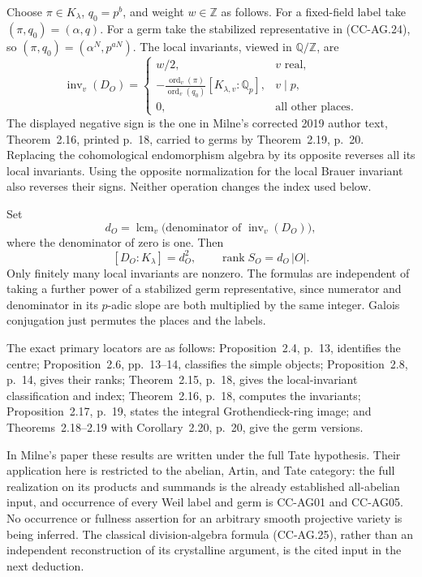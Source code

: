 Choose \(\pi\in K_\lambda\), \(q_0=p^b\), and weight
\(w\in\mathbb Z\) as follows.  For a fixed-field label take
\((\pi,q_0)=(\alpha,q)\).  For a germ take the stabilized
representative in (CC-AG.24), so
\((\pi,q_0)=(\alpha^N,p^{aN})\).
The local invariants, viewed in \(\mathbb Q/\mathbb Z\), are
\[
 \operatorname{inv}_v(D_O)=
 \begin{cases}
   w/2,&v\text{ real},\\[2pt]
   -\displaystyle\frac{\operatorname{ord}_v(\pi)}
                         {\operatorname{ord}_v(q_0)}
        [K_{\lambda,v}:\mathbb Q_p],&v\mid p,\\[7pt]
   0,&\text{all other places}.
 \end{cases}                                                \tag{CC-AG.25}
\]
The displayed negative sign is the one in Milne's corrected
2019 author text, Theorem~2.16, printed p.~18, carried to
germs by Theorem~2.19, p.~20.  Replacing the cohomological
endomorphism algebra by its opposite reverses all its local
invariants.  Using the opposite normalization for the local
Brauer invariant also reverses their signs.  Neither
operation changes the index used below.

Set
\[
        d_O=\operatorname{lcm}_{v}
            \bigl(\text{denominator of }
                        \operatorname{inv}_v(D_O)\bigr),
                                                               \tag{CC-AG.26}
\]
where the denominator of zero is one.  Then
\[
        [D_O:K_\lambda]=d_O^2,\qquad
        \operatorname{rank}S_O=d_O\,|O|.                       \tag{CC-AG.27}
\]
Only finitely many local invariants are nonzero.
The formulas are independent of taking a further power of a
stabilized germ representative, since numerator and denominator
in its \(p\)-adic slope are both multiplied by the same integer.
Galois conjugation just permutes the places and the labels.

The exact primary locators are as follows: Proposition~2.4,
p.~13, identifies the centre; Proposition~2.6, pp.~13--14,
classifies the simple objects; Proposition~2.8, p.~14, gives
their ranks; Theorem~2.15, p.~18, gives the local-invariant
classification and index; Theorem~2.16, p.~18, computes
the invariants; Proposition~2.17, p.~19, states the integral
Grothendieck-ring image; and Theorems~2.18--2.19 with
Corollary~2.20, p.~20, give the germ versions.

In Milne's paper these results are written under the full Tate
hypothesis.  Their application here is restricted to the
abelian, Artin, and Tate category: the full realization on its
products and summands is the already established all-abelian
input, and occurrence of every Weil label and germ is
CC-AG01 and CC-AG05.  No occurrence or fullness assertion for
an arbitrary smooth projective variety is being inferred.
The classical division-algebra formula (CC-AG.25), rather
than an independent reconstruction of its crystalline
argument, is the cited input in the next deduction.

